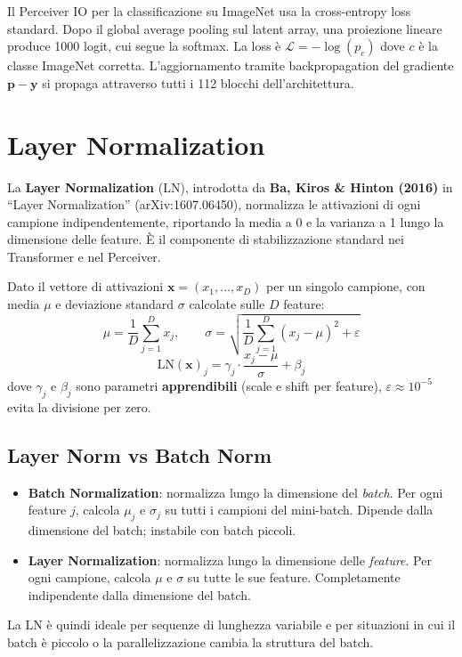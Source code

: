 \documentclass[
  11pt,
]{article}
\begin{document}
\begin{notabox}[title={\textbf{Cross-entropy nel Perceiver}}]
Il Perceiver IO per la classificazione su ImageNet usa la cross-entropy loss standard. Dopo il global average pooling sul latent array, una proiezione lineare produce 1000 logit, cui segue la softmax. La loss è $\mathcal{L} = -\log(p_c)$ dove $c$ è la classe ImageNet corretta. L'aggiornamento tramite backpropagation del gradiente $\mathbf{p} - \mathbf{y}$ si propaga attraverso tutti i 112 blocchi dell'architettura.
\end{notabox}

\section{Layer Normalization}
\label{app:layernorm}

La \textbf{Layer Normalization} (LN), introdotta da \textbf{Ba, Kiros \& Hinton (2016)} in ``Layer Normalization'' (arXiv:1607.06450), normalizza le attivazioni di ogni campione indipendentemente, riportando la media a 0 e la varianza a 1 lungo la dimensione delle feature. È il componente di stabilizzazione standard nei Transformer e nel Perceiver.

\begin{formulabox}[title={\textbf{Layer Normalization}}]
Dato il vettore di attivazioni $\mathbf{x} = (x_1, \ldots, x_D)$ per un singolo campione, con media $\mu$ e deviazione standard $\sigma$ calcolate sulle $D$ feature:
\[
\mu = \frac{1}{D}\sum_{j=1}^{D} x_j, \qquad
\sigma = \sqrt{\frac{1}{D}\sum_{j=1}^{D}(x_j - \mu)^2 + \varepsilon}
\]
\[
\text{LN}(\mathbf{x})_j = \gamma_j \cdot \frac{x_j - \mu}{\sigma} + \beta_j
\]
dove $\gamma_j$ e $\beta_j$ sono parametri \textbf{apprendibili} (scale e shift per feature), $\varepsilon \approx 10^{-5}$ evita la divisione per zero.
\end{formulabox}

\subsection{Layer Norm vs Batch Norm}

\begin{notabox}[title={\textbf{Differenza fondamentale tra LN e BatchNorm}}]
\begin{itemize}
  \item \textbf{Batch Normalization}: normalizza lungo la dimensione del \emph{batch}. Per ogni feature $j$, calcola $\mu_j$ e $\sigma_j$ su tutti i campioni del mini-batch. Dipende dalla dimensione del batch; instabile con batch piccoli.
  \item \textbf{Layer Normalization}: normalizza lungo la dimensione delle \emph{feature}. Per ogni campione, calcola $\mu$ e $\sigma$ su tutte le sue feature. Completamente indipendente dalla dimensione del batch.
\end{itemize}
La LN è quindi ideale per sequenze di lunghezza variabile e per situazioni in cui il batch è piccolo o la parallelizzazione cambia la struttura del batch.
\end{notabox}
\end{document}
